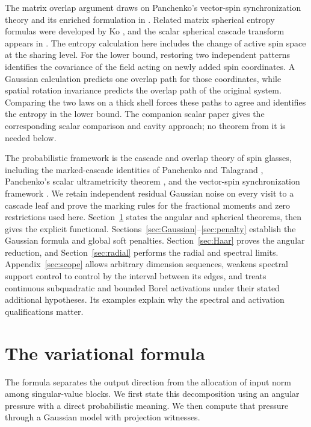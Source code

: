 \documentclass[11pt]{article}
\numberwithin{equation}{section}
\theoremstyle{definition}
\begin{document}
The matrix overlap argument draws on Panchenko's vector-spin synchronization theory \cite{PanVector} and its enriched formulation in \cite{Mourrat2023}. Related matrix spherical entropy formulas were developed by Ko \cite{Ko2019}, and the scalar spherical cascade transform appears in \cite[Proposition~3.1]{Mourrat2022}. The entropy calculation here includes the change of active spin space at the sharing level. For the lower bound, restoring two independent patterns identifies the covariance of the field acting on newly added spin coordinates. A Gaussian calculation predicts one overlap path for those coordinates, while spatial rotation invariance predicts the overlap path of the original system. Comparing the two laws on a thick shell forces these paths to agree and identifies the entropy in the lower bound. The companion scalar paper \cite[Sections~5--7]{scalar} gives the corresponding scalar comparison and cavity approach; no theorem from it is needed below.

The probabilistic framework is the cascade and overlap theory of spin glasses, including the marked-cascade identities of Panchenko and Talagrand \cite{PT}, Panchenko's scalar ultrametricity theorem \cite{PanUltrametric}, and the vector-spin synchronization framework \cite{PanVector}. We retain independent residual Gaussian noise on every visit to a cascade leaf and prove the marking rules for the fractional moments and zero restrictions used here. Section~\ref{sec:formula} states the angular and spherical theorems, then gives the explicit functional. Sections~\ref{sec:Gaussian}--\ref{sec:penalty} establish the Gaussian formula and global soft penalties. Section~\ref{sec:Haar} proves the angular reduction, and Section~\ref{sec:radial} performs the radial and spectral limits. Appendix~\ref{sec:scope} allows arbitrary dimension sequences, weakens spectral support control to control by the interval between its edges, and treats continuous subquadratic and bounded Borel activations under their stated additional hypotheses. Its examples explain why the spectral and activation qualifications matter.

\section{The variational formula}
\label{sec:formula}
The formula separates the output direction from the allocation of input norm among singular-value blocks. We first state this decomposition using an angular pressure with a direct probabilistic meaning. We then compute that pressure through a Gaussian model with projection witnesses.
\end{document}

